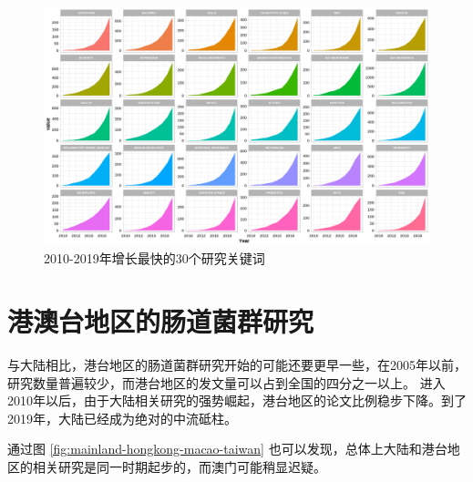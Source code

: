 \documentclass[]{ctexbook}
\begin{document}
\begin{figure}
\includegraphics[width=1\linewidth]{plots/china-study-keyword-growth-1} \caption{2010-2019年增长最快的30个研究关键词}\label{fig:china-study-keyword-growth}
\end{figure}

\hypertarget{ux6e2fux6fb3ux53f0ux5730ux533aux7684ux80a0ux9053ux83ccux7fa4ux7814ux7a76}{%
\section{港澳台地区的肠道菌群研究}\label{ux6e2fux6fb3ux53f0ux5730ux533aux7684ux80a0ux9053ux83ccux7fa4ux7814ux7a76}}

与大陆相比，港台地区的肠道菌群研究开始的可能还要更早一些，在2005年以前，研究数量普遍较少，而港台地区的发文量可以占到全国的四分之一以上。
进入2010年以后，由于大陆相关研究的强势崛起，港台地区的论文比例稳步下降。到了2019年，大陆已经成为绝对的中流砥柱。

通过图 \ref{fig:mainland-hongkong-macao-taiwan} 也可以发现，总体上大陆和港台地区的相关研究是同一时期起步的，而澳门可能稍显迟疑。
\end{document}
